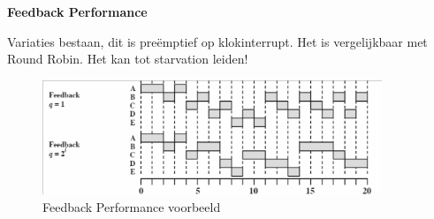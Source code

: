 \textbf{Feedback Performance}

Variaties bestaan, dit is preëmptief op klokinterrupt. Het is vergelijkbaar met Round Robin. Het kan tot starvation leiden!

\begin{figure}[htp]
    \centering
            \includegraphics[width=4in]{img/feedbackperformance.png}
        \caption{Feedback Performance voorbeeld}
    \label{fig:Feedback Performance voorbeeld}
\end{figure}












